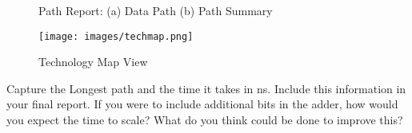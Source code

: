 \documentclass[12pt]{betterjournal}
\begin{document}
\begin{figure}
    \caption{Path Report: (a) Data Path (b) Path Summary}
    \label{fig:pathreport}
\end{figure}

\begin{figure}
    \centering
    \texttt{[image: images/techmap.png]}
    \caption{Technology Map View}
    \label{fig:techmap}
\end{figure}
\hfill\break
\begin{question}
    Capture the Longest path and the time it takes in ns. Include this information in your final report. If you were to include additional bits in the adder, how would you expect the time to scale? What do you think could be done to improve this?
\end{question}
\clearpage
\end{document}
